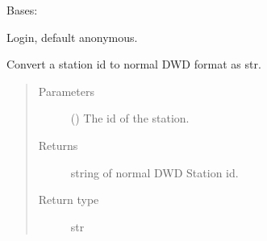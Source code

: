 \documentclass[letterpaper,10pt,english]{sphinxmanual}
\begin{document}
\begin{fulllineitems}
\label{\detokenize{weatherDB.lib.max_fun:weatherDB.lib.max_fun.import_DWD.FTP}}
\sphinxAtStartPar
Bases: 

\begin{fulllineitems}
\label{\detokenize{weatherDB.lib.max_fun:weatherDB.lib.max_fun.import_DWD.FTP.login}}
\sphinxAtStartPar
Login, default anonymous.

\end{fulllineitems}


\end{fulllineitems}


\begin{fulllineitems}
\label{\detokenize{weatherDB.lib.max_fun:weatherDB.lib.max_fun.import_DWD.dwd_id_to_str}}
\sphinxAtStartPar
Convert a station id to normal DWD format as str.
\begin{quote}\begin{description}
\item[{Parameters}] \leavevmode
\sphinxAtStartPar
{} () \textendash{} The id of the station.

\item[{Returns}] \leavevmode
\sphinxAtStartPar
string of normal DWD Station id.

\item[{Return type}] \leavevmode
\sphinxAtStartPar
str

\end{description}\end{quote}

\end{fulllineitems}
\end{document}
